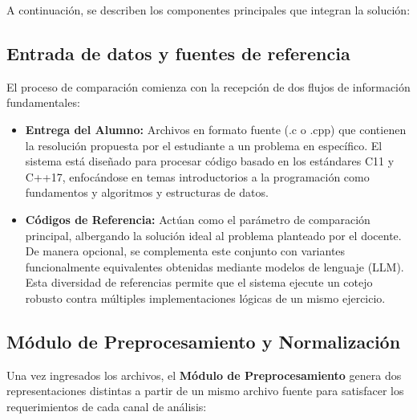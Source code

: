 A continuación, se describen los componentes principales que integran la solución:


\subsection{Entrada de datos y fuentes de referencia}

El proceso de comparación comienza con la recepción de dos flujos de información fundamentales:

\begin{itemize}
	\item \textbf{Entrega del Alumno:} Archivos en formato fuente (.c o .cpp) que contienen la resolución propuesta por el estudiante a un problema en específico. El sistema está diseñado para procesar código basado en los estándares C11 y C++17, enfocándose en temas introductorios a la programación como fundamentos y algoritmos y estructuras de datos.

	\item \textbf{Códigos de Referencia:} Actúan como el parámetro de comparación principal, albergando la solución ideal al problema planteado por el docente. De manera opcional, se complementa este conjunto con variantes funcionalmente equivalentes obtenidas mediante modelos de lenguaje (LLM). Esta diversidad de referencias permite que el sistema ejecute un cotejo robusto contra múltiples implementaciones lógicas de un mismo ejercicio.
\end{itemize}


\subsection{Módulo de Preprocesamiento y Normalización}

Una vez ingresados los archivos, el \textbf{Módulo de Preprocesamiento} genera dos representaciones distintas a partir de un mismo archivo fuente para satisfacer los requerimientos de cada canal de análisis:


